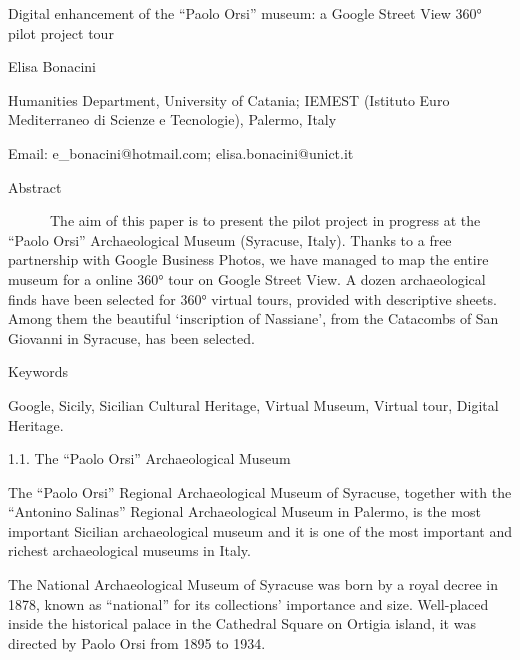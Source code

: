 \documentclass[amsthm,ebook]{saparticle}
\title{}
\author{}
\date{2015-12-11}
\begin{document}
Digital enhancement of the “Paolo Orsi” museum: a Google Street View 360° pilot project tour \newline


Elisa Bonacini

Humanities Department, University of Catania; IEMEST (Istituto Euro Mediterraneo di Scienze e Tecnologie), Palermo,
Italy 

Email: e\_bonacini@hotmail.com; elisa.bonacini@unict.it

\newline
Abstract

\ \ \ \ \ \ The aim of this paper is to present the pilot project in progress at the “Paolo Orsi” Archaeological Museum
(Syracuse, Italy). Thanks to a free partnership with Google Business Photos, we have managed to map the entire museum
for a online 360° tour on Google Street View. A dozen archaeological finds have been selected for 360° virtual tours,
provided with descriptive sheets. Among them the beautiful ‘inscription of Nassiane’, from the Catacombs of San
Giovanni in Syracuse, has been selected.


\bigskip

Keywords

Google, Sicily, Sicilian Cultural Heritage, Virtual Museum, Virtual tour, Digital Heritage. 


\bigskip


\bigskip

1.1. The “Paolo Orsi” Archaeological Museum

The “Paolo Orsi” Regional Archaeological Museum of Syracuse, together with the “Antonino Salinas” Regional
Archaeological Museum in Palermo, is the most important Sicilian archaeological museum and it is one of the most
important and richest archaeological museums in Italy. 

The National Archaeological Museum of Syracuse was born by a royal decree in 1878, known as “national” for its
collections’ importance and size. Well-placed inside the historical palace in the Cathedral Square on Ortigia island,
it was directed by Paolo Orsi from 1895 to 1934. 
\end{document}

